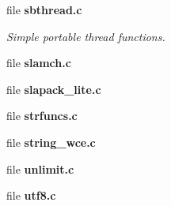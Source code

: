 \begin{DoxyCompactItemize}
file {\bf sbthread.\-c}
\begin{DoxyCompactList}\small\item\em Simple portable thread functions. \end{DoxyCompactList}\item 
file {\bfseries slamch.\-c}
\item 
file {\bfseries slapack\-\_\-lite.\-c}
\item 
file {\bfseries strfuncs.\-c}
\item 
file {\bfseries string\-\_\-wce.\-c}
\item 
file {\bfseries unlimit.\-c}
\item 
file {\bfseries utf8.\-c}
\end{DoxyCompactItemize}
